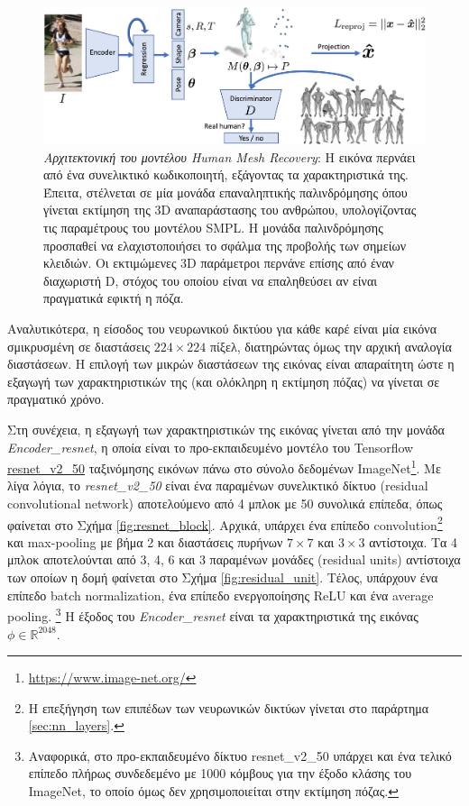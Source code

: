 \begin{figure}[H]
	\centering
	\includegraphics[scale=1.5]{images/chapter3/hmr_architecture.jpg}
	\caption[Αρχιτεκτονική του μοντέλου Human Mesh Recovery]{\textsl{Αρχιτεκτονική του μοντέλου Human Mesh Recovery}: H εικόνα περνάει από ένα συνελικτικό κωδικοποιητή, εξάγοντας τα χαρακτηριστικά της. Έπειτα, στέλνεται σε μία μονάδα επαναληπτικής παλινδρόμησης όπου γίνεται εκτίμηση της 3D αναπαράστασης του ανθρώπου, υπολογίζοντας τις παραμέτρους του μοντέλου SMPL. Η μονάδα παλινδρόμησης προσπαθεί να ελαχιστοποιήσει το σφάλμα της προβολής των σημείων κλειδιών. Οι εκτιμώμενες 3D παράμετροι περνάνε επίσης από έναν διαχωριστή D, στόχος του οποίου είναι να επαληθεύσει αν είναι πραγματικά εφικτή η πόζα.}
	\label{fig:hmr_architecture}
\end{figure}

Αναλυτικότερα, η είσοδος του νευρωνικού δικτύου για κάθε καρέ είναι μία εικόνα σμικρυσμένη σε διαστάσεις $224 \times 224$ πίξελ, διατηρώντας όμως την αρχική αναλογία διαστάσεων. Η επιλογή των μικρών διαστάσεων της εικόνας είναι απαραίτητη ώστε η εξαγωγή των χαρακτηριστικών της (και ολόκληρη η εκτίμηση πόζας) να γίνεται σε πραγματικό χρόνο.

Στη συνέχεια, η εξαγωγή των χαρακτηριστικών της εικόνας γίνεται από την μονάδα \textsl{Encoder\_resnet}, η οποία είναι το προ-εκπαιδευμένο μοντέλο του Tensorflow \href{https://github.com/tensorflow/models/blob/master/research/slim/nets/resnet\_v2.py}{resnet\_v2\_50} ταξινόμησης εικόνων πάνω στο σύνολο δεδομένων ImageNet\footnote{\href{https://www.image-net.org/}{https://www.image-net.org/}}. Με λίγα λόγια, το \textsl{resnet\_v2\_50} είναι ένα παραμένων συνελικτικό δίκτυο (residual convolutional network) αποτελούμενο από 4 μπλοκ με 50 συνολικά επίπεδα, όπως φαίνεται στο Σχήμα \ref{fig:resnet_block}. Αρχικά, υπάρχει ένα επίπεδο convolution\footnote{Η επεξήγηση των επιπέδων των νευρωνικών δικτύων γίνεται στο παράρτημα \ref{sec:nn_layers}.} και max-pooling με βήμα 2 και διαστάσεις πυρήνων $7 \times 7$ και $3 \times 3$ αντίστοιχα. Τα 4 μπλοκ αποτελούνται από 3, 4, 6 και 3 παραμένων μονάδες (residual units) αντίστοιχα των οποίων η δομή φαίνεται στο Σχήμα \ref{fig:residual_unit}. Τέλος, υπάρχουν ένα επίπεδο batch normalization, ένα επίπεδο ενεργοποίησης ReLU και ένα average pooling. \footnote{Αναφορικά, στο προ-εκπαιδευμένο δίκτυο resnet\_v2\_50 υπάρχει και ένα τελικό επίπεδο πλήρως συνδεδεμένο με 1000 κόμβους για την έξοδο κλάσης του ImageNet, το οποίο όμως δεν χρησιμοποιείται στην εκτίμηση πόζας.} Η έξοδος του \textsl{Encoder\_resnet} είναι τα χαρακτηριστικά της εικόνας $\phi \in \mathbb{R}^{2048}$.

